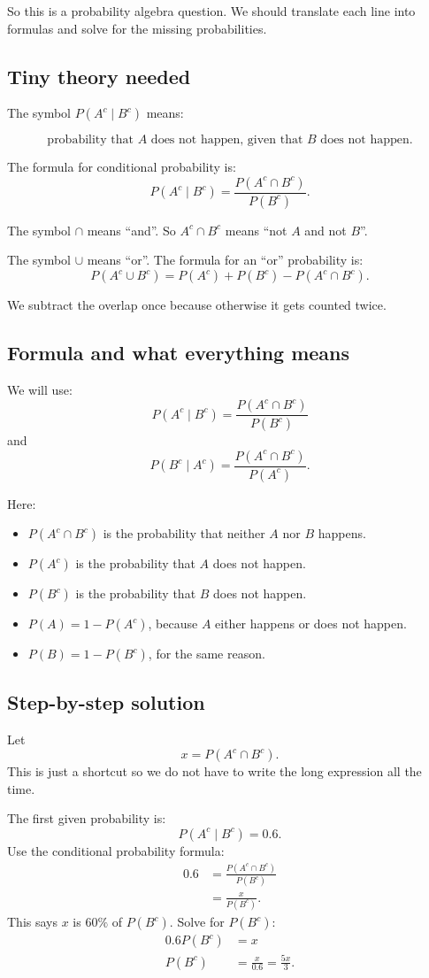 \documentclass[11pt,a4paper]{article}
\begin{document}
So this is a probability algebra question. We should translate each line into formulas and solve for the missing probabilities.

\subsection*{Tiny theory needed}
The symbol \(P(A^c\mid B^c)\) means:

\[
\text{probability that \(A\) does not happen, given that \(B\) does not happen.}
\]

The formula for conditional probability is:
\[
P(A^c\mid B^c)=\frac{P(A^c\cap B^c)}{P(B^c)}.
\]

The symbol \(\cap\) means ``and''. So \(A^c\cap B^c\) means ``not \(A\) and not \(B\)''.

The symbol \(\cup\) means ``or''. The formula for an ``or'' probability is:
\[
P(A^c\cup B^c)=P(A^c)+P(B^c)-P(A^c\cap B^c).
\]

We subtract the overlap once because otherwise it gets counted twice.

\subsection*{Formula and what everything means}
We will use:
\[
P(A^c\mid B^c)=\frac{P(A^c\cap B^c)}{P(B^c)}
\]
and
\[
P(B^c\mid A^c)=\frac{P(A^c\cap B^c)}{P(A^c)}.
\]

Here:
\begin{itemize}[leftmargin=*]
    \item \(P(A^c\cap B^c)\) is the probability that neither \(A\) nor \(B\) happens.
    \item \(P(A^c)\) is the probability that \(A\) does not happen.
    \item \(P(B^c)\) is the probability that \(B\) does not happen.
    \item \(P(A)=1-P(A^c)\), because \(A\) either happens or does not happen.
    \item \(P(B)=1-P(B^c)\), for the same reason.
\end{itemize}

\subsection*{Step-by-step solution}
Let
\[
x=P(A^c\cap B^c).
\]
This is just a shortcut so we do not have to write the long expression all the time.

The first given probability is:
\[
P(A^c\mid B^c)=0.6.
\]
Use the conditional probability formula:
\begin{align*}
0.6
&=\frac{P(A^c\cap B^c)}{P(B^c)}\\
&=\frac{x}{P(B^c)}.
\end{align*}
This says \(x\) is \(60\%\) of \(P(B^c)\). Solve for \(P(B^c)\):
\begin{align*}
0.6P(B^c)&=x\\
P(B^c)&=\frac{x}{0.6}
=\frac{5x}{3}.
\end{align*}
\end{document}
